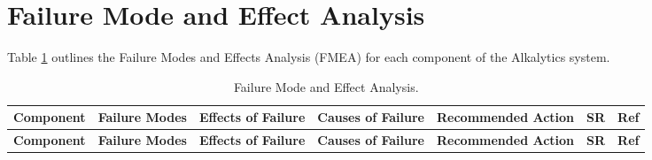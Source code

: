 \documentclass{article}
\begin{document}
\section{Failure Mode and Effect Analysis}
Table \ref{table:FMEA} outlines the Failure Modes and Effects Analysis (FMEA)
for each component of the Alkalytics system.
\begin{landscape}
  \begin{longtable}{|p{2.5cm}|p{4cm}|p{4cm}|p{4cm}|p{4cm}|p{1.25cm}|p{1cm}|}
      \caption{Failure Mode and Effect Analysis.} \label{table:FMEA} \\
      \hline
      \textbf{Component} & \textbf{Failure Modes} & \textbf{Effects of Failure}
      & \textbf{Causes of Failure} & \textbf{Recommended Action} & \textbf{SR} &
      \textbf{Ref} \\
      \hline
      \endfirsthead
      
      \hline
      \textbf{Component} & \textbf{Failure Modes} & \textbf{Effects of Failure}
      & \textbf{Causes of Failure} & \textbf{Recommended Action} & \textbf{SR} &
      \textbf{Ref} \\
      \hline
      \endhead
      

\end{longtable}
\end{landscape}
\end{document}
